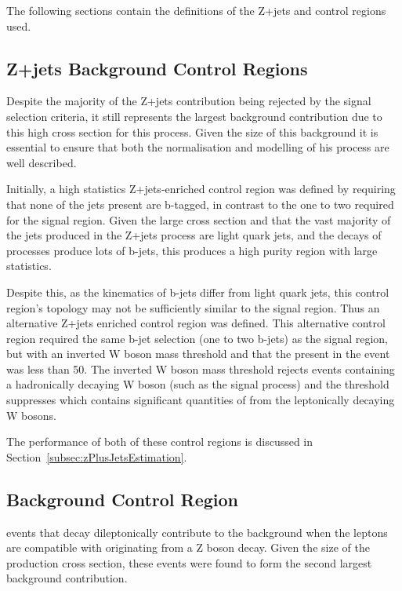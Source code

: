 The following sections contain the definitions of the Z+jets and \ttbar control regions used.

\subsection{Z+jets Background Control Regions}\label{subsec:zPlusJetsCR}
Despite the majority of the Z+jets contribution being rejected by the signal selection criteria, it still represents the largest background contribution due to this high cross section for this process.
Given the size of this background it is essential to ensure that both the normalisation and modelling of his process are well described.

Initially, a high statistics Z+jets-enriched control region was defined by requiring that none of the jets present are b-tagged, in contrast to the one to two required for the signal region.
Given the large cross section and that the vast majority of the jets produced in the Z+jets process are light quark jets, and the decays of \ttbar processes produce lots of b-jets, this produces a high purity region with large statistics.

Despite this, as the kinematics of b-jets differ from light quark jets, this control region's topology may not be sufficiently similar to the signal region.
Thus an alternative Z+jets enriched control region was defined.
This alternative control region required the same b-jet selection (one to two b-jets) as the signal region, but with an inverted W boson mass threshold and that the \MET present in the event was less than 50\GeV.
The inverted W boson mass threshold rejects events containing a hadronically decaying W boson (such as the signal process) and the \MET threshold suppresses \ttbar which contains significant quantities of \MET from the leptonically decaying W bosons.

The performance of both of these control regions is discussed in Section~\ref{subsec:zPlusJetsEstimation}.

\subsection{\ttbar Background Control Region}\label{subsec:ttbarCR}
\ttbar events that decay dileptonically contribute to the background when the leptons are compatible with originating from a Z boson decay.
Given the size of the \ttbar production cross section, these events were found to form the second largest background contribution.

